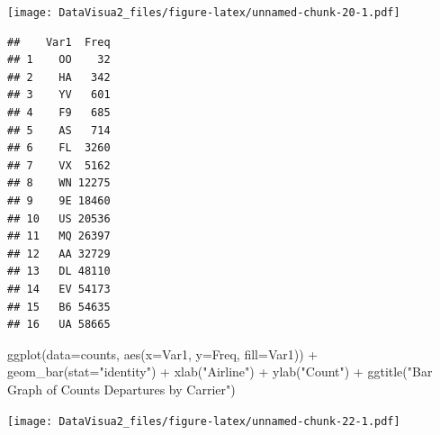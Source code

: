 \documentclass[
]{article}
\newenvironment{Shaded}{\begin{snugshade}}{\end{snugshade}}
\newcommand{\AttributeTok}[1]{\textcolor[rgb]{0.77,0.63,0.00}{#1}}
\newcommand{\CommentTok}[1]{\textcolor[rgb]{0.56,0.35,0.01}{\textit{#1}}}
\newcommand{\DecValTok}[1]{\textcolor[rgb]{0.00,0.00,0.81}{#1}}
\newcommand{\FunctionTok}[1]{\textcolor[rgb]{0.00,0.00,0.00}{#1}}
\newcommand{\NormalTok}[1]{#1}
\newcommand{\OtherTok}[1]{\textcolor[rgb]{0.56,0.35,0.01}{#1}}
\newcommand{\SpecialCharTok}[1]{\textcolor[rgb]{0.00,0.00,0.00}{#1}}
\newcommand{\StringTok}[1]{\textcolor[rgb]{0.31,0.60,0.02}{#1}}
\begin{document}
\texttt{[image: DataVisua2\_files/figure-latex/unnamed-chunk-20-1.pdf]}

\begin{Shaded}
\end{Shaded}

\begin{verbatim}
##    Var1  Freq
## 1    OO    32
## 2    HA   342
## 3    YV   601
## 4    F9   685
## 5    AS   714
## 6    FL  3260
## 7    VX  5162
## 8    WN 12275
## 9    9E 18460
## 10   US 20536
## 11   MQ 26397
## 12   AA 32729
## 13   DL 48110
## 14   EV 54173
## 15   B6 54635
## 16   UA 58665
\end{verbatim}

\begin{Shaded}
\begin{Highlighting}[]
\FunctionTok{ggplot}\NormalTok{(}\AttributeTok{data=}\NormalTok{counts, }\FunctionTok{aes}\NormalTok{(}\AttributeTok{x=}\NormalTok{Var1, }\AttributeTok{y=}\NormalTok{Freq, }\AttributeTok{fill=}\NormalTok{Var1)) }\SpecialCharTok{+} \FunctionTok{geom\_bar}\NormalTok{(}\AttributeTok{stat=}\StringTok{"identity"}\NormalTok{) }\SpecialCharTok{+} \FunctionTok{xlab}\NormalTok{(}\StringTok{"Airline"}\NormalTok{) }\SpecialCharTok{+} \FunctionTok{ylab}\NormalTok{(}\StringTok{"Count"}\NormalTok{) }\SpecialCharTok{+} \FunctionTok{ggtitle}\NormalTok{(}\StringTok{"Bar Graph of Counts Departures by Carrier"}\NormalTok{)}
\end{Highlighting}
\end{Shaded}

\texttt{[image: DataVisua2\_files/figure-latex/unnamed-chunk-22-1.pdf]}

\begin{Shaded}
\end{Shaded}
\end{document}
